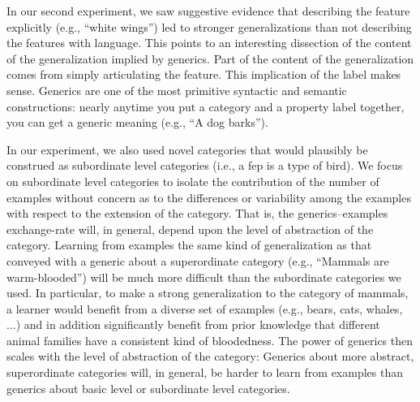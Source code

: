 \documentclass[10pt,letterpaper]{article}
\begin{document}
In our second experiment, we saw suggestive evidence that describing the feature explicitly (e.g., ``white wings'') led to stronger generalizations than not describing the features with language. 
This points to an interesting dissection of the content of the generalization implied by generics. Part of the content of the generalization comes from simply articulating the feature. This implication of the label makes sense.  Generics are one of the most primitive syntactic and semantic constructions: nearly anytime you put a category and a property label together, you can get a generic meaning (e.g., ``A dog barks''). 

In our experiment, we also used novel categories that would plausibly be construed as subordinate level categories (i.e., a fep is a type of bird).
We focus on subordinate level categories to isolate the contribution of the number of examples without concern as to the differences or variability among the examples with respect to the extension of the category.
That is, the generics--examples exchange-rate will, in general, depend upon the level of abstraction of the category. 
Learning from examples the same kind of generalization as that conveyed with a generic about a superordinate category (e.g., ``Mammals are warm-blooded'') will be much more difficult than the subordinate categories we used. 
In particular, to make a strong generalization to the category of mammals, a learner would benefit from a diverse set of examples (e.g., bears, cats, whales, ...) and in addition significantly benefit from prior knowledge that different animal families have a consistent kind of bloodedness. 
The power of generics then scales with the level of abstraction of the category: Generics about more abstract, superordinate categories will, in general, be harder to learn from examples than generics about basic level or subordinate level categories. 
\end{document}
